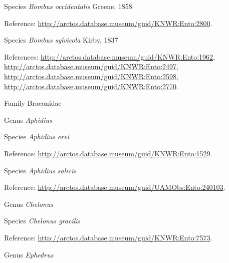 \documentclass[9pt, article]{memoir}
\begin{document}
\begin{multicols}{2}
\vspace{6pt}\noindent\hspace{36pt}Species \textit{Bombus occidentalis} Greene, 1858


\vspace{6pt}Reference: 
\url{http://arctos.database.museum/guid/KNWR:Ento:2800}.

\vspace{6pt}\noindent\hspace{36pt}Species \textit{Bombus sylvicola} Kirby, 1837


\vspace{6pt}References: 
\url{http://arctos.database.museum/guid/KNWR:Ento:1962}, 
\url{http://arctos.database.museum/guid/KNWR:Ento:2497}, 
\url{http://arctos.database.museum/guid/KNWR:Ento:2598}, 
\url{http://arctos.database.museum/guid/KNWR:Ento:2770}.

\vspace{6pt}\noindent\hspace{24pt}Family Braconidae


\vspace{6pt}\noindent\hspace{30pt}Genus \textit{Aphidius}


\vspace{6pt}\noindent\hspace{36pt}Species \textit{Aphidius ervi}


\vspace{6pt}Reference: 
\url{http://arctos.database.museum/guid/KNWR:Ento:1529}.

\vspace{6pt}\noindent\hspace{36pt}Species \textit{Aphidius salicis}


\vspace{6pt}Reference: 
\url{http://arctos.database.museum/guid/UAMObs:Ento:240103}.

\vspace{6pt}\noindent\hspace{30pt}Genus \textit{Chelonus}


\vspace{6pt}\noindent\hspace{36pt}Species \textit{Chelonus gracilis}


\vspace{6pt}Reference: 
\url{http://arctos.database.museum/guid/KNWR:Ento:7573}.

\vspace{6pt}\noindent\hspace{30pt}Genus \textit{Ephedrus}



\end{multicols}
\end{document}

